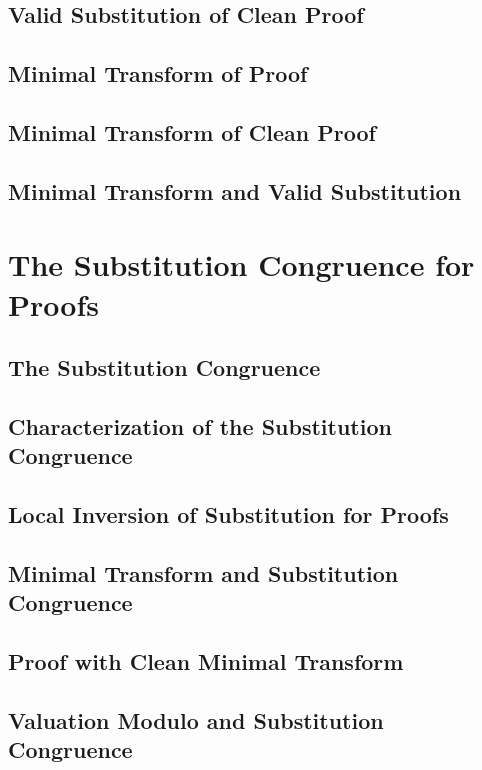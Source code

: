 \documentclass{report}
\begin{document}
    \subsection{Valid Substitution of Clean Proof}
      
    \subsection{Minimal Transform of Proof}
      
    \subsection{Minimal Transform of Clean Proof}
      
    \subsection{Minimal Transform and Valid Substitution}
      
\section{The Substitution Congruence for Proofs}
    \subsection{The Substitution Congruence}
      
    \subsection{Characterization of the Substitution Congruence}
      
    \subsection{Local Inversion of Substitution for Proofs}
      
    \subsection{Minimal Transform and Substitution Congruence}
      
    \subsection{Proof with Clean Minimal Transform}
      
    \subsection{Valuation Modulo and Substitution Congruence}
      
\end{document}
